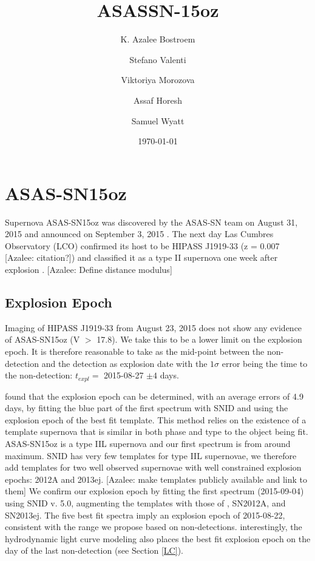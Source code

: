 \documentclass[preprint]{aastex61}
\newcommand{\azaleecomment}[1]{{\color{red} [{#1}]}}
\newcommand{\Azalee}[1]{\azaleecomment{Azalee: #1}}
\begin{document}
\title{ASASSN-15oz}
\author{K. Azalee Bostroem}

\author{Stefano Valenti}

\author{Viktoriya Morozova}

\author{Assaf Horesh}

\author{Samuel Wyatt}


\date{\today}							%

\begin{abstract}
\end{abstract}
\section{ASAS-SN15oz} \label{15ozIntro}
Supernova ASAS-SN15oz was discovered by the ASAS-SN team on August 31, 2015 and announced on September 3, 2015 \citep{2016brown}. 
The next day Las Cumbres Observatory (LCO) confirmed its host to be HIPASS J1919-33 (z = 0.007 \Azalee{citation?}) and classified it as a type II supernova one week after explosion \citep{2016hosseinzadeh}. 
\Azalee{Define distance modulus}
\subsection{Explosion Epoch}
Imaging of HIPASS J1919-33 from August 23, 2015 does not show any evidence of ASAS-SN15oz (V $>$ 17.8). 
We take this to be a lower limit on the explosion epoch. 
It is therefore reasonable to take as the mid-point between the non-detection and the detection as explosion date with the $1\sigma$ error being the time to the non-detection: $t_{expl} =$ 2015-08-27 $\pm 4$ days.

\citet{2017gutierrez} found that the explosion epoch can be determined, with an average errors of 4.9 days, by fitting the blue part of the first spectrum with SNID \citep{2011blondin} and using the explosion epoch of the best fit template.
This method relies on the existence of a template supernova that is similar in both phase and type to the object being fit.
ASAS-SN15oz is a type IIL supernova and our first spectrum is from around maximum. 
SNID has very few templates for type IIL supernovae, we therefore add templates for two well observed supernovae with well constrained explosion epochs: 2012A and 2013ej.
\Azalee{make templates publicly available and link to them}
We confirm our explosion epoch by fitting the first spectrum (2015-09-04) using SNID v. 5.0, augmenting the templates with those of \citet{2017gutierrez}, SN2012A, and SN2013ej.
The five best fit spectra imply an explosion epoch of  2015-08-22, consistent with the range we propose based on non-detections.
interestingly, the hydrodynamic light curve modeling also places the best fit explosion epoch on the day of the last non-detection (see Section \ref{LC}).
\end{document}
